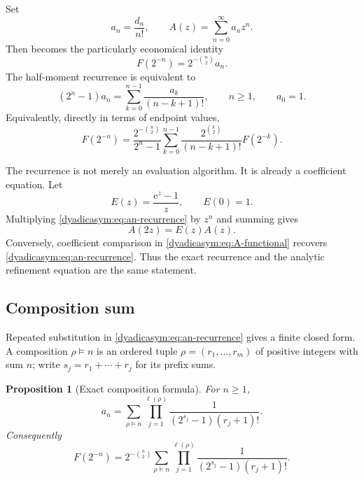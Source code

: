\documentclass[11pt,oneside]{article}
\newtheorem{proposition}[theorem]{Proposition}
\theoremstyle{definition}
\theoremstyle{remark}
\newcommand{\e}{\mathrm e}
\begin{document}
Set
\begin{equation}
 a_n=\frac{d_n}{n!},
 \qquad
 A(z)=\sum_{n=0}^{\infty}a_nz^n.                            \label{dyadicasym:eq:an-A}
\end{equation}
Then  becomes the particularly economical identity
\begin{equation}
 \boxed{F(2^{-n})=2^{-\binom n2}a_n.}                       \label{dyadicasym:eq:F-an}
\end{equation}
The half-moment recurrence is equivalent to
\begin{equation}
 (2^n-1)a_n=\sum_{k=0}^{n-1}\frac{a_k}{(n-k+1)!},
 \qquad n\ge1,
 \qquad a_0=1.                                              \label{dyadicasym:eq:an-recurrence}
\end{equation}
Equivalently, directly in terms of endpoint values,
\begin{equation}
 F(2^{-n})=
 \frac{2^{-\binom n2}}{2^n-1}
 \sum_{k=0}^{n-1}\frac{2^{\binom k2}}{(n-k+1)!}F(2^{-k}).  \label{dyadicasym:eq:F-recurrence}
\end{equation}

The recurrence is not merely an evaluation algorithm.  It is already a coefficient equation.
Let
\begin{equation}
 E(z)=\frac{\e^z-1}{z},\qquad E(0)=1.                       \label{dyadicasym:eq:E}
\end{equation}
Multiplying \eqref{dyadicasym:eq:an-recurrence} by $z^n$ and summing gives
\begin{equation}
 \boxed{A(2z)=E(z)A(z).}                                    \label{dyadicasym:eq:A-functional}
\end{equation}
Conversely, coefficient comparison in \eqref{dyadicasym:eq:A-functional} recovers
\eqref{dyadicasym:eq:an-recurrence}.  Thus the exact recurrence and the analytic refinement equation are
the same statement.

\subsection{Composition sum}

Repeated substitution in \eqref{dyadicasym:eq:an-recurrence} gives a finite closed form.  A composition
$\rho\vDash n$ is an ordered tuple $\rho=(r_1,\ldots,r_m)$ of positive integers with sum
$n$; write $s_j=r_1+\cdots+r_j$ for its prefix sums.

\begin{proposition}[Exact composition formula]
\label{dyadicasym:prop:composition}
For $n\ge1$,
\begin{equation}
 a_n=
 \sum_{\rho\vDash n}
 \prod_{j=1}^{\ell(\rho)}
 \frac{1}{(2^{s_j}-1)(r_j+1)!}.                             \label{dyadicasym:eq:composition-an}
\end{equation}
Consequently
\begin{equation}
 F(2^{-n})=2^{-\binom n2}
 \sum_{\rho\vDash n}
 \prod_{j=1}^{\ell(\rho)}
 \frac{1}{(2^{s_j}-1)(r_j+1)!}.                             \label{dyadicasym:eq:composition-F}
\end{equation}
\end{proposition}
\end{document}
